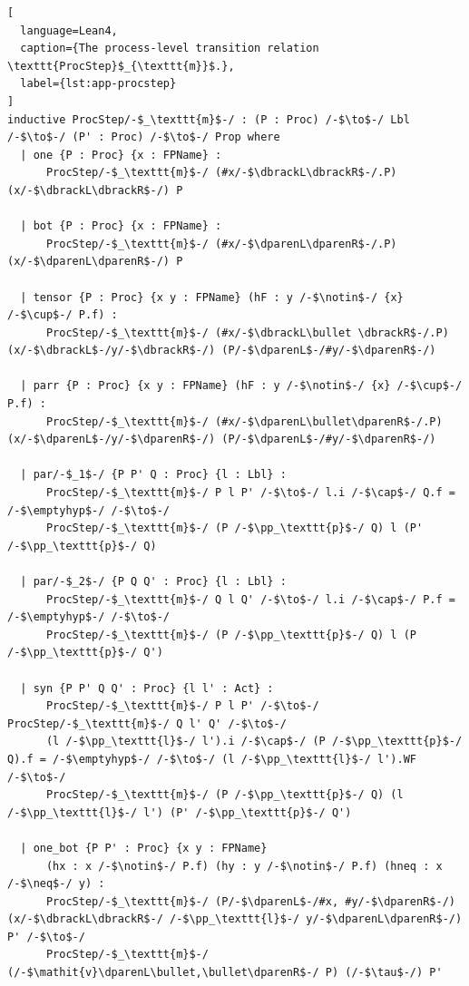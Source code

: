 \begin{lstlisting}[
  language=Lean4,
  caption={The process-level transition relation \texttt{ProcStep}$_{\texttt{m}}$.},
  label={lst:app-procstep}
]
inductive ProcStep/-$_\texttt{m}$-/ : (P : Proc) /-$\to$-/ Lbl /-$\to$-/ (P' : Proc) /-$\to$-/ Prop where
  | one {P : Proc} {x : FPName} :
      ProcStep/-$_\texttt{m}$-/ (#x/-$\dbrackL\dbrackR$-/.P) (x/-$\dbrackL\dbrackR$-/) P

  | bot {P : Proc} {x : FPName} :
      ProcStep/-$_\texttt{m}$-/ (#x/-$\dparenL\dparenR$-/.P) (x/-$\dparenL\dparenR$-/) P

  | tensor {P : Proc} {x y : FPName} (hF : y /-$\notin$-/ {x} /-$\cup$-/ P.f) :
      ProcStep/-$_\texttt{m}$-/ (#x/-$\dbrackL\bullet \dbrackR$-/.P) (x/-$\dbrackL$-/y/-$\dbrackR$-/) (P/-$\dparenL$-/#y/-$\dparenR$-/)

  | parr {P : Proc} {x y : FPName} (hF : y /-$\notin$-/ {x} /-$\cup$-/ P.f) :
      ProcStep/-$_\texttt{m}$-/ (#x/-$\dparenL\bullet\dparenR$-/.P) (x/-$\dparenL$-/y/-$\dparenR$-/) (P/-$\dparenL$-/#y/-$\dparenR$-/)

  | par/-$_1$-/ {P P' Q : Proc} {l : Lbl} :
      ProcStep/-$_\texttt{m}$-/ P l P' /-$\to$-/ l.i /-$\cap$-/ Q.f = /-$\emptyhyp$-/ /-$\to$-/
      ProcStep/-$_\texttt{m}$-/ (P /-$\pp_\texttt{p}$-/ Q) l (P' /-$\pp_\texttt{p}$-/ Q)

  | par/-$_2$-/ {P Q Q' : Proc} {l : Lbl} :
      ProcStep/-$_\texttt{m}$-/ Q l Q' /-$\to$-/ l.i /-$\cap$-/ P.f = /-$\emptyhyp$-/ /-$\to$-/
      ProcStep/-$_\texttt{m}$-/ (P /-$\pp_\texttt{p}$-/ Q) l (P /-$\pp_\texttt{p}$-/ Q')

  | syn {P P' Q Q' : Proc} {l l' : Act} :
      ProcStep/-$_\texttt{m}$-/ P l P' /-$\to$-/ ProcStep/-$_\texttt{m}$-/ Q l' Q' /-$\to$-/
      (l /-$\pp_\texttt{l}$-/ l').i /-$\cap$-/ (P /-$\pp_\texttt{p}$-/ Q).f = /-$\emptyhyp$-/ /-$\to$-/ (l /-$\pp_\texttt{l}$-/ l').WF /-$\to$-/
      ProcStep/-$_\texttt{m}$-/ (P /-$\pp_\texttt{p}$-/ Q) (l /-$\pp_\texttt{l}$-/ l') (P' /-$\pp_\texttt{p}$-/ Q')

  | one_bot {P P' : Proc} {x y : FPName} 
      (hx : x /-$\notin$-/ P.f) (hy : y /-$\notin$-/ P.f) (hneq : x /-$\neq$-/ y) :
      ProcStep/-$_\texttt{m}$-/ (P/-$\dparenL$-/#x, #y/-$\dparenR$-/) (x/-$\dbrackL\dbrackR$-/ /-$\pp_\texttt{l}$-/ y/-$\dparenL\dparenR$-/) P' /-$\to$-/
      ProcStep/-$_\texttt{m}$-/ (/-$\mathit{v}\dparenL\bullet,\bullet\dparenR$-/ P) (/-$\tau$-/) P'


\end{lstlisting}
